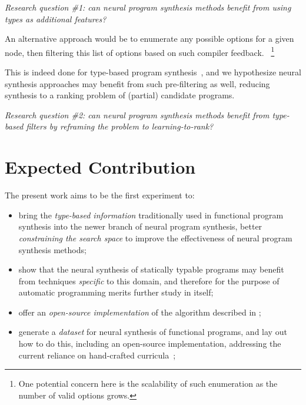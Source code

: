 \documentclass{article}
\begin{document}
\begin{displayquote} %
    \emph{Research question \#1: can neural program synthesis methods benefit from using types as additional features?}
\end{displayquote}

An alternative approach would be to enumerate any possible options for a given node,
then filtering this list of options based on such compiler feedback.%
~\footnote{One potential concern here is the scalability of such enumeration as the number of valid options grows.}

This is indeed done for type-based program synthesis~\citep{myth},
and we hypothesize neural synthesis approaches may benefit from such pre-filtering as well,
reducing synthesis to a ranking problem of (partial) candidate programs.

\begin{displayquote} \label{hyp:filter}
    \emph{Research question \#2: can neural program synthesis methods benefit from type-based filters by reframing the problem to learning-to-rank?}
\end{displayquote}


\section{Expected Contribution} %

The present work aims to be the first experiment to:
\begin{itemize}
    \item bring the \emph{type-based information} traditionally used in functional program synthesis into the newer branch of neural program synthesis,
    better \emph{constraining the search space} to improve the effectiveness of neural program synthesis methods;
    \item show that the neural synthesis of statically typable programs may benefit from techniques \emph{specific} to this domain, and therefore for the purpose of automatic programming merits further study in itself;
    \item offer an \emph{open-source implementation} of the algorithm described in \citet{nsps};
    \item generate a \emph{dataset} for neural synthesis of functional programs, and lay out how to do this, including an open-source implementation, addressing the current reliance on hand-crafted curricula~\citep{nps};
\end{itemize}
\end{document}
